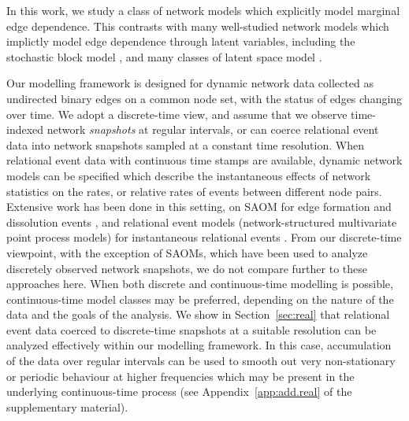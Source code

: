 \documentclass[12pt]{article}
\newcommand{\0}{{\bf 0}}
\begin{document}
In this work, we study a class of network models which explicitly model marginal edge dependence.
This contrasts with many well-studied network models which implictly model edge dependence through latent variables, including the stochastic block model \citep[SBM,][]{karrer2011stochastic_supp}, and many classes of latent space model \citep[LSM,][]{matias2014modeling_supp}.

Our modelling framework is designed for dynamic network data collected as undirected binary edges on a common node set, with the status of edges changing over time.
We adopt a discrete-time view, and assume that we observe time-indexed network {\em snapshots} at regular intervals, or can coerce relational event data into network snapshots sampled at a constant time resolution.
When relational event data with continuous time stamps are available, dynamic network models can be specified which describe the instantaneous effects of network statistics on the rates, or relative rates of events between different node pairs.
Extensive work has been done in this setting, %
on SAOM for edge formation and dissolution events \citep{snijders2017stochastic_supp, koskinen2023multilevel_supp}, and relational event models (network-structured multivariate point process models) for instantaneous relational events \citep[]{PerryWolfe2013_supp,matias2018semiparametric_supp,butts2023relational_supp,bianchi2024relational_supp}. 
From our discrete-time viewpoint, with the exception of SAOMs, which have been used to analyze discretely observed network snapshots, we do not compare further to these approaches here. 
When both discrete and continuous-time modelling is possible, continuous-time model classes may be preferred, depending on the nature of the data and the goals of the analysis.
We show in Section~\ref{sec:real} that relational event data coerced to discrete-time snapshots at a suitable resolution can be analyzed effectively within our modelling framework. In this case, accumulation of the data over regular intervals can be used to smooth out very non-stationary or periodic behaviour at higher frequencies which may be present in the underlying continuous-time process (see Appendix~\ref{app:add.real} of the supplementary material).
\end{document}
